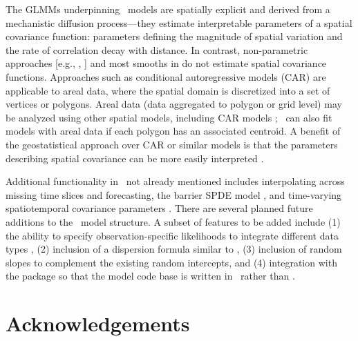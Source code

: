 \documentclass[article]{jss}\usepackage[]{graphicx}\usepackage[dvipsnames]{xcolor}
\newcommand{\sdmTMB}{\pkg{sdmTMB}}
\newcommand{\R}{\proglang{R}}
\begin{document}
The GLMMs underpinning \sdmTMB\ models are spatially explicit and derived from a mechanistic diffusion process---they estimate interpretable parameters of a spatial covariance function: parameters defining the magnitude of spatial variation and the rate of correlation decay with distance.
In contrast, non-parametric approaches [e.g.,  \citep{liaw2002},  \citep{phillips2006}] and most smooths in  \citep{wood2017a} do not estimate spatial covariance functions.
Approaches such as conditional autoregressive models (CAR) are applicable to areal data, where the spatial domain is discretized into a set of vertices or polygons.
Areal data (data aggregated to polygon or grid level) may be analyzed using other spatial models, including CAR models \citep[e.g.,][]{verhoef2018}; \sdmTMB\ can also fit models with areal data if each polygon has an associated centroid.
A benefit of the geostatistical approach over CAR or similar models is that the parameters describing spatial covariance can be more easily interpreted \citep{wall2004}.

Additional functionality in \sdmTMB\ not already mentioned includes interpolating across missing time slices and forecasting, the barrier SPDE model \citep{bakka2019}, and time-varying spatiotemporal covariance parameters \citep{ward2022}.
There are several planned future additions to the \sdmTMB\ model structure.
A subset of features to be added include
(1) the ability to specify observation-specific likelihoods to integrate different data types \citep[e.g.,][]{gruss2019multiple},
(2) inclusion of a dispersion formula similar to ,
(3) inclusion of random slopes to complement the existing random intercepts,
and
(4) integration with the  \citep{rtmb} package so that the model code base is written in \R\ rather than .

\section{Acknowledgements}\label{acknowledgements}
\end{document}
